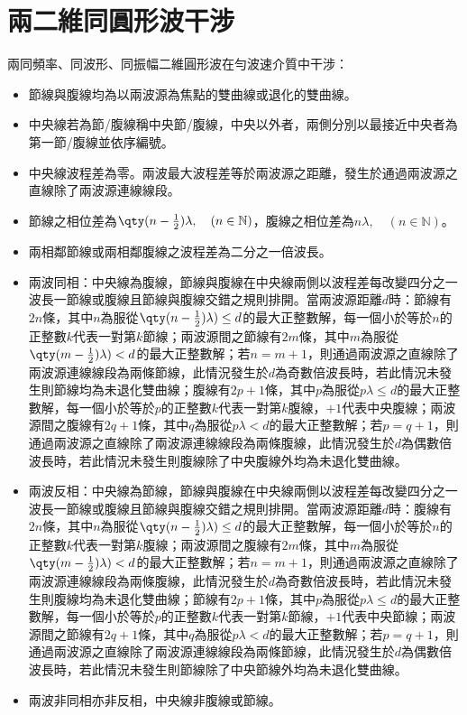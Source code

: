 \documentclass[a4paper,12pt]{report}
\begin{document}
\section{兩二維同圓形波干涉}
兩同頻率、同波形、同振幅二維圓形波在勻波速介質中干涉：
\begin{itemize}
\item 節線與腹線均為以兩波源為焦點的雙曲線或退化的雙曲線。
\item 中央線若為節/腹線稱中央節/腹線，中央以外者，兩側分別以最接近中央者為第一節/腹線並依序編號。
\item 中央線波程差為零。兩波最大波程差等於兩波源之距離，發生於通過兩波源之直線除了兩波源連線線段。
\item 節線之相位差為$\qty(n-\frac{1}{2})\lambda ,\quad (n\in\mathbb{N})$，腹線之相位差為$n\lambda,\quad (n\in\mathbb{N})$。
\item 兩相鄰節線或兩相鄰腹線之波程差為二分之一倍波長。
\item 兩波同相：中央線為腹線，節線與腹線在中央線兩側以波程差每改變四分之一波長一節線或腹線且節線與腹線交錯之規則排開。當兩波源距離$d$時：節線有$2n$條，其中$n$為服從$\qty(n-\frac{1}{2})\lambda)\leq d$的最大正整數解，每一個小於等於$n$的正整數$k$代表一對第$k$節線；兩波源間之節線有$2m$條，其中$m$為服從$\qty(m-\frac{1}{2})\lambda)< d$的最大正整數解；若$n=m+1$，則通過兩波源之直線除了兩波源連線線段為兩條節線，此情況發生於$d$為奇數倍波長時，若此情況未發生則節線均為未退化雙曲線；腹線有$2p+1$條，其中$p$為服從$p\lambda\leq d$的最大正整數解，每一個小於等於$p$的正整數$k$代表一對第$k$腹線，$+1$代表中央腹線；兩波源間之腹線有$2q+1$條，其中$q$為服從$p\lambda< d$的最大正整數解；若$p=q+1$，則通過兩波源之直線除了兩波源連線線段為兩條腹線，此情況發生於$d$為偶數倍波長時，若此情況未發生則腹線除了中央腹線外均為未退化雙曲線。
\item 兩波反相：中央線為節線，節線與腹線在中央線兩側以波程差每改變四分之一波長一節線或腹線且節線與腹線交錯之規則排開。當兩波源距離$d$時：腹線有$2n$條，其中$n$為服從$\qty(n-\frac{1}{2})\lambda)\leq d$的最大正整數解，每一個小於等於$n$的正整數$k$代表一對第$k$腹線；兩波源間之腹線有$2m$條，其中$m$為服從$\qty(m-\frac{1}{2})\lambda)< d$的最大正整數解；若$n=m+1$，則通過兩波源之直線除了兩波源連線線段為兩條腹線，此情況發生於$d$為奇數倍波長時，若此情況未發生則腹線均為未退化雙曲線；節線有$2p+1$條，其中$p$為服從$p\lambda\leq d$的最大正整數解，每一個小於等於$p$的正整數$k$代表一對第$k$節線，$+1$代表中央節線；兩波源間之節線有$2q+1$條，其中$q$為服從$p\lambda< d$的最大正整數解；若$p=q+1$，則通過兩波源之直線除了兩波源連線線段為兩條節線，此情況發生於$d$為偶數倍波長時，若此情況未發生則節線除了中央節線外均為未退化雙曲線。
\item 兩波非同相亦非反相，中央線非腹線或節線。
\end{itemize}
\end{document}
